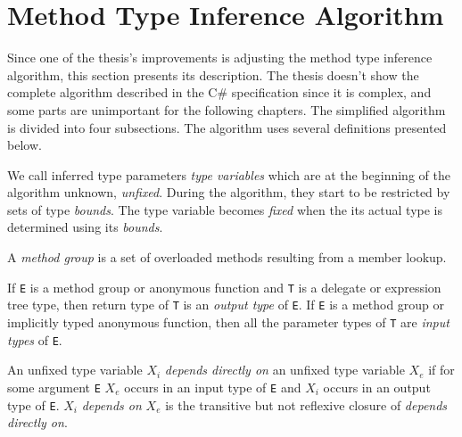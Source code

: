 \section{Method Type Inference Algorithm} \label{sect02:MTIA}

Since one of the thesis's improvements is adjusting the method type inference algorithm, this section presents
its description. 
The thesis doesn’t show the complete algorithm described in the C\# specification \cite{online:csTypeInference} since it is complex, and some parts are unimportant for the following chapters. 
The simplified algorithm is divided into four subsections. 
The algorithm uses several definitions presented below.
\begin{defn}
We call inferred type parameters \emph{type variables} which are at the beginning of the algorithm unknown, \emph{unfixed}. 
During the algorithm, they start to be restricted by sets of type \emph{bounds}.
The type variable becomes \emph{fixed} when the its actual type is determined using its \emph{bounds}.
\end{defn}
\begin{defn}
A \emph{method group} is a set of overloaded methods resulting from a member lookup.
\end{defn}
\begin{defn}
If \texttt{E} is a method group or anonymous function and \texttt{T} is a delegate or expression tree type, then return type of \texttt{T} is an \emph{output type} of \texttt{E}.
If \texttt{E} is a method group or implicitly typed anonymous function, then all the parameter types of \texttt{T} are \emph{input types} of \texttt{E}. 
\end{defn}
\begin{defn}[Dependence]
An unfixed type variable \texttt{$X_i$} \emph{depends directly on} an unfixed type variable \texttt{$X_e$} if for some argument \texttt{E} \texttt{$X_e$} occurs in an input type of \texttt{E} and \texttt{$X_i$} occurs in an output type of \texttt{E}.
\texttt{$X_i$} \emph{depends on} \texttt{$X_e$} is the transitive but not reflexive closure of \emph{depends directly on}.
\end{defn}
